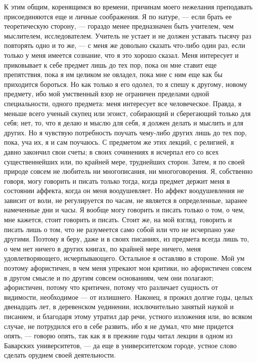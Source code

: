 \documentclass[12pt]{article}
\begin{document}
К этим общим, коренящимся во времени, причинам моего нежелания преподавать присоединяются еще и личные соображения. Я по натуре, --- если брать ее теоретическую сторону, --- гораздо менее предназначен быть учителем, чем мыслителем, исследователем. Учитель не устает и не должен уставать тысячу раз повторять одно и то же, --- с меня же довольно сказать что-либо один раз, если только у меня имеется сознание, что я это хорошо сказал. Меня интересует и приковывает к себе предмет лишь до тех пор, пока он мне ставит еще препятствия, пока я им целиком не овладел, пока мне с ним еще как бы приходится бороться. Но как только я его одолел, то я спешу к другому, новому предмету, ибо мой умственный взор не ограничен пределами одной специальности, одного предмета: меня интересует все человеческое. Правда, я меньше всего ученый скупец или эгоист, собирающий и сберегающий только для себя; нет, то, что я делаю и мыслю для себя, я должен делать и мыслить и для других. Но я чувствую потребность поучать чему-либо других лишь до тех пор, пока, уча их, я и сам поучаюсь. С предметом же этих лекций, с религией, я давно закончил свои счеты; в своих сочинениях я исчерпал его со всех существеннейших или, по крайней мере, труднейших сторон. Затем, я по своей природе совсем не любитель ни многописания, ни многоговорения. Я, собственно говоря, могу говорить и писать только тогда, когда предмет держит меня в состоянии аффекта, когда он меня воодушевляет. Но аффект воодушевления не зависит от воли, не регулируется по часам, не является в определенные, заранее намеченные дни и часы. Я вообще могу говорить и писать только о том, о чем, мне кажется, стоит говорить и писать. Стоит же, на мой взгляд, говорить и писать лишь о том, что не разумеется само собой или что не исчерпано уже другими. Поэтому я беру, даже и в своих писаниях, из предмета всегда лишь то, о чем нет ничего в других книгах, по крайней мере ничего, меня удовлетворяющего, исчерпывающего. Остальное я оставляю в стороне. Мой ум поэтому афористичен, в чем меня упрекают мои критики, но афористичен совсем в другом смысле и по другим совсем основаниям, чем они полагают; афористичен, потому что критичен, потому что различает сущность от видимости, необходимое --- от излишнего. Наконец, я прожил долгие годы, целых двенадцать лет, в деревенском уединении, исключительно занятый наукой и писанием, и благодаря этому утратил дар речи, устного изложения или, во всяком случае, не потрудился его в себе развить, ибо я не думал, что мне придется опять, --- говорю опять, так как я в прежние годы читал лекции в одном из Баварских университетов, --- да еще в университетском городе, устное слово сделать орудием своей деятельности. 
\end{document}
